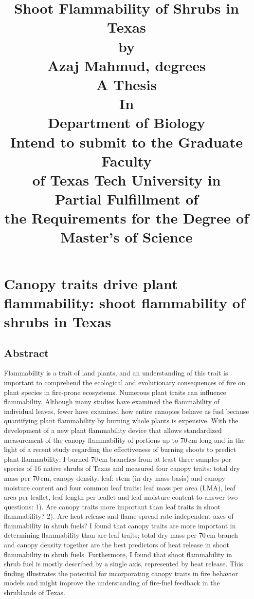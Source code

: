 \documentclass[12pt]{report}
\title{
Shoot Flammability of Shrubs in Texas\\[15pt]
by\\
Azaj Mahmud, degrees\\
A Thesis\\
In\\
Department of Biology\\
Intend to submit to the Graduate Faculty\\
of Texas Tech University in\\
Partial Fulfillment of\\
the Requirements for the Degree of\\
Master's of Science\\}
\begin{document}
\maketitle
\tableofcontents
\listoftables
\listoffigures
\doublespacing

\chapter{Canopy traits drive plant flammability: shoot flammability of shrubs in Texas}

\section{Abstract}
    
Flammability is a trait of land plants, and an understanding of this trait is important to comprehend the ecological and evolutionary consequences of fire on plant species in fire-prone ecosystems. Numerous plant traits can influence flammability. Although many studies have examined the flammability of individual leaves, fewer have examined how entire canopies behave as fuel because quantifying plant flammability by burning whole plants is expensive. With the development of a new plant flammability device that allows standardized measurement of the canopy flammability of portions up to 70\,cm long and in the light of a recent study regarding the effectiveness of burning shoots to predict plant flammability; I burned 70\,cm branches from at least three samples per species of 16 native shrubs of Texas and measured four canopy traits: total dry mass per 70\,cm, canopy density, leaf: stem (in dry mass basis) and canopy moisture content and four common leaf traits: leaf mass per area (LMA), leaf area per leaflet, leaf length per leaflet and leaf moisture content to answer two questions: 1). Are canopy traits more important than leaf traits in shoot flammability? 2). Are heat release and flame spread rate independent axes of flammability in shrub fuels? I found that canopy traits are more important in determining flammability than are leaf traits; total dry mass per 70\,cm branch and canopy density together are the best predictors of heat release in shoot flammability in shrub fuels. Furthermore, I found that shoot flammability in shrub fuel is mostly described by a single axis, represented by heat release. This finding illustrates the potential for incorporating canopy traits in fire behavior models and might improve the understanding of fire-fuel feedback in the shrublands of Texas.
\end{document}
